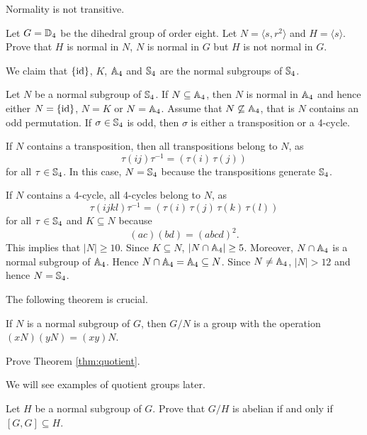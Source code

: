 Normality is not transitive. 

\begin{exercise}
Let $G=\mathbb{D}_4$ be the dihedral group of order eight. Let $N=\langle s,r^2\rangle$ and $H=\langle s\rangle$.
Prove that $H$ is normal in $N$, $N$ is normal in $G$ but $H$ is not normal in $G$. 
\end{exercise}

\begin{example}
We claim that $\{\operatorname{id}\}$, $K$, $\mathbb{A}_4$ and $\mathbb{S}_4$ are the normal subgroups of $\mathbb{S}_4$.

Let $N$ be a normal subgroup of $\mathbb{S}_4$. If $N\subseteq\mathbb{A}_4$, then
$N$ is normal in $\mathbb{A}_4$ and hence either $N=\{\operatorname{id}\}$,
$N=K$ or $N=\mathbb{A}_4$. Assume that $N\not\subseteq\mathbb{A}_4$, that is
$N$ contains an odd permutation. If $\sigma\in\mathbb{S}_4$ is odd, then 
$\sigma$ is either a transposition or a 4-cycle. 
 
If $N$ contains a transposition, then all transpositions 
belong to $N$, as 
\[
\tau(ij)\tau^{-1}=(\tau(i)\,\tau(j))
\]
for all $\tau\in\mathbb{S}_4$. In this case, $N=\mathbb{S}_4$ because 
the transpositions generate $\mathbb{S}_4$. 


If $N$ contains a 4-cycle, all 4-cycles belong to $N$, as 
\[
\tau(ijkl)\tau^{-1}=(\tau(i)\,\tau(j)\,\tau(k)\,\tau(l))
\]
for all $\tau\in\mathbb{S}_4$ and $K\subseteq N$ because 
\[
(ac)(bd)=(abcd)^2.
\]
This implies that $|N|\geq10$. Since $K\subseteq N$,  $|N\cap\mathbb{A}_4|\geq 5$. Moreover, $N\cap\mathbb{A}_4$ is a normal subgroup of $\mathbb{A}_4$.
Hence $N\cap\mathbb{A}_4=\mathbb{A}_4\subseteq N$. Since $N\ne \mathbb{A}_4$, $|N|>12$ and hence $N=\mathbb{S}_4$.
\end{example}

The following theorem is crucial.

\begin{theorem}
\label{thm:quotient}
If $N$ is a normal subgroup of $G$, then
$G/N$ is a group with the operation 
$(xN)(yN)=(xy)N$.
\end{theorem}

\begin{exercise}
    Prove Theorem \ref{thm:quotient}.   
\end{exercise}


We will see examples of quotient groups later. 

\begin{exercise}
\label{xca:commutator}
Let $H$ be a normal subgroup of $G$. Prove that
$G/H$ is abelian if and only if $[G,G]\subseteq H$.
\end{exercise}

